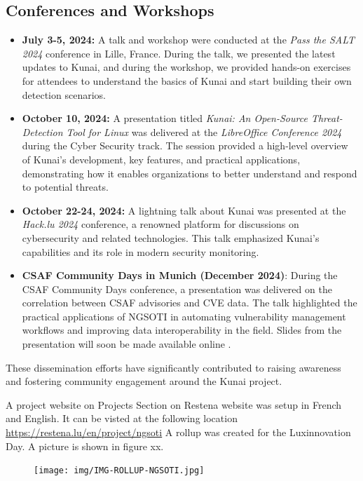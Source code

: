 \subsection*{Conferences and Workshops}
\begin{itemize}
    \item \textbf{July 3-5, 2024:} A talk and workshop were conducted at the \emph{Pass the SALT 2024} conference in Lille, France. During the talk, we presented the latest updates to Kunai, and during the workshop, we provided hands-on exercises for attendees to understand the basics of Kunai and start building their own detection scenarios.
    \item \textbf{October 10, 2024:} A presentation titled \emph{Kunai: An Open-Source Threat-Detection Tool for Linux} was delivered at the \emph{LibreOffice Conference 2024} during the Cyber Security track. The session provided a high-level overview of Kunai’s development, key features, and practical applications, demonstrating how it enables organizations to better understand and respond to potential threats.
    \item \textbf{October 22-24, 2024:} A lightning talk about Kunai was presented at the \emph{Hack.lu 2024} conference, a renowned platform for discussions on cybersecurity and related technologies. This talk emphasized Kunai's capabilities and its role in modern security monitoring.
    \item \textbf{CSAF Community Days in Munich (December 2024)}:
    During the CSAF Community Days conference, a presentation was delivered on the correlation between CSAF advisories and CVE data. The talk highlighted the practical applications of NGSOTI in automating vulnerability management workflows and improving data interoperability in the field. Slides from the presentation will soon be made available online \cite{csaf_munich}.
\end{itemize}



These dissemination efforts have significantly contributed to raising awareness and fostering community engagement around the Kunai project.



A project website on Projects Section on Restena website was setup in French and English.
It can be visted at the following location \url{  https://restena.lu/en/project/ngsoti}
A rollup was created for the Luxinnovation Day. A picture is shown in figure xx.

\begin{figure}
    \texttt{[image: img/IMG-ROLLUP-NGSOTI.jpg]}
\end{figure}

